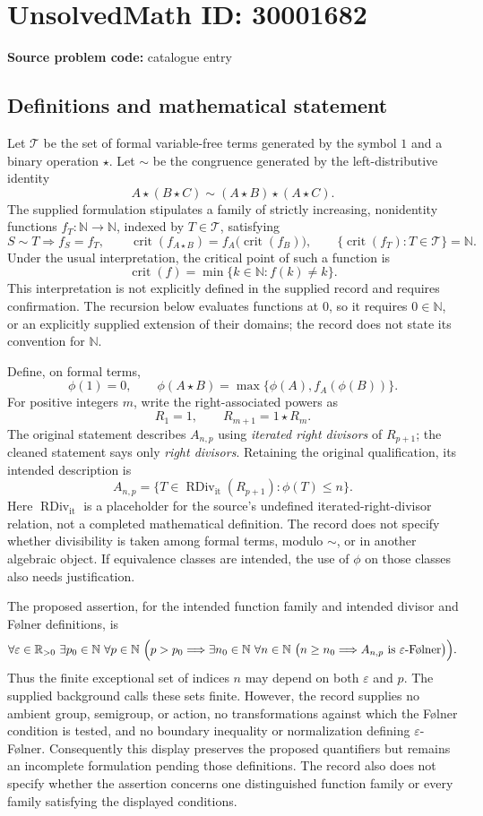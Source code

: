 \documentclass[11pt]{article}
\newcommand{\N}{\mathbb{N}}
\newcommand{\R}{\mathbb{R}}
\begin{document}
\section*{UnsolvedMath ID: 30001682}
\textbf{Source problem code:} catalogue entry
\subsection{Definitions and mathematical statement}
Let \(\mathcal T\) be the set of formal variable-free terms generated by the symbol \(1\) and a binary operation \(\star\). Let \(\sim\) be the congruence generated by the left-distributive identity
\[
 A\star(B\star C)\sim(A\star B)\star(A\star C).
\]
The supplied formulation stipulates a family of strictly increasing, nonidentity functions \(f_T:\N\to\N\), indexed by \(T\in\mathcal T\), satisfying
\[
 S\sim T\Longrightarrow f_S=f_T,
 \qquad
 \operatorname{crit}(f_{A\star B})
 =f_A\bigl(\operatorname{crit}(f_B)\bigr),
 \qquad
 \{\operatorname{crit}(f_T):T\in\mathcal T\}=\N.
\]
Under the usual interpretation, the critical point of such a function is
\[
 \operatorname{crit}(f)=\min\{k\in\N:f(k)\ne k\}.
\]
This interpretation is not explicitly defined in the supplied record and requires confirmation. The recursion below evaluates functions at \(0\), so it requires \(0\in\N\), or an explicitly supplied extension of their domains; the record does not state its convention for \(\N\).

Define, on formal terms,
\[
 \phi(1)=0,
 \qquad
 \phi(A\star B)=\max\{\phi(A),f_A(\phi(B))\}.
\]
For positive integers \(m\), write the right-associated powers as
\[
 R_1=1,\qquad R_{m+1}=1\star R_m.
\]
The original statement describes \(A_{n,p}\) using \emph{iterated right divisors} of \(R_{p+1}\); the cleaned statement says only \emph{right divisors}. Retaining the original qualification, its intended description is
\[
 A_{n,p}
 =\{T\in\operatorname{RDiv}_{\mathrm{it}}(R_{p+1}):\phi(T)\le n\}.
\]
Here \(\operatorname{RDiv}_{\mathrm{it}}\) is a placeholder for the source's undefined iterated-right-divisor relation, not a completed mathematical definition. The record does not specify whether divisibility is taken among formal terms, modulo \(\sim\), or in another algebraic object. If equivalence classes are intended, the use of \(\phi\) on those classes also needs justification.

The proposed assertion, for the intended function family and intended divisor and F\o lner definitions, is
\[
 \forall\varepsilon\in\R_{>0}\ \exists p_0\in\N\
 \forall p\in\N\ \Bigl(p>p_0\Longrightarrow
 \exists n_0\in\N\ \forall n\in\N\
 \bigl(n\ge n_0\Longrightarrow
 A_{n,p}\text{ is }\varepsilon\text{-F\o lner}\bigr)\Bigr).
\]
Thus the finite exceptional set of indices \(n\) may depend on both \(\varepsilon\) and \(p\). The supplied background calls these sets finite. However, the record supplies no ambient group, semigroup, or action, no transformations against which the F\o lner condition is tested, and no boundary inequality or normalization defining \(\varepsilon\)-F\o lner. Consequently this display preserves the proposed quantifiers but remains an incomplete formulation pending those definitions. The record also does not specify whether the assertion concerns one distinguished function family or every family satisfying the displayed conditions.
\end{document}
